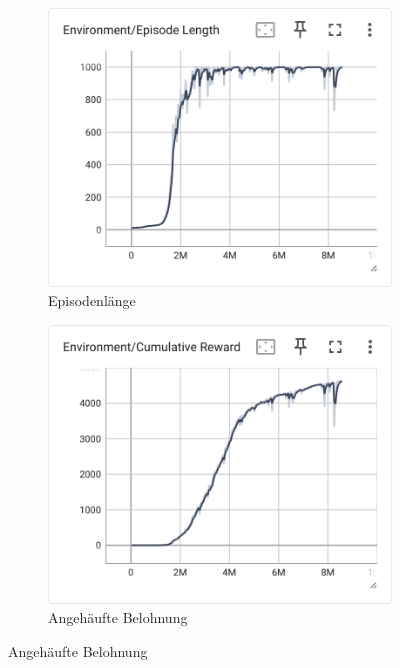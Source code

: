 \begin{figure}[H]
  \centering  
  \begin{subfigure}{.49\textwidth}
      \centering  
      \includegraphics[width=\textwidth]{img/128_episode_length}
      \caption{Episodenlänge}
      \label{fig:128_episode_length}
    \end{subfigure}
    \begin{subfigure}{.49\textwidth}
      \centering  
      \includegraphics[width=\textwidth]{img/128_cumulative_reward}
      \caption{Angehäufte Belohnung}
      \label{fig:128_cumulative_reward}

\end{subfigure}
\end{figure}
